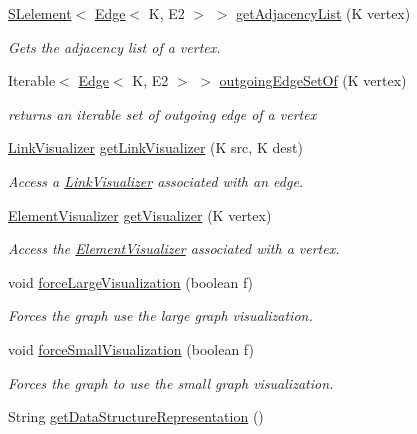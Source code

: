 \begin{DoxyCompactItemize}
\mbox{\hyperlink{classbridges_1_1base_1_1_s_lelement}{S\+Lelement}}$<$ \mbox{\hyperlink{classbridges_1_1base_1_1_edge}{Edge}}$<$ K, E2 $>$ $>$ \mbox{\hyperlink{classbridges_1_1base_1_1_graph_adj_list_aa8d25bc56b9a172999f0c62ee7e04b6f}{get\+Adjacency\+List}} (K vertex)
\begin{DoxyCompactList}\small\item\em Gets the adjacency list of a vertex. \end{DoxyCompactList}\item 
Iterable$<$ \mbox{\hyperlink{classbridges_1_1base_1_1_edge}{Edge}}$<$ K, E2 $>$ $>$ \mbox{\hyperlink{classbridges_1_1base_1_1_graph_adj_list_a084693f2f464b8f1d21d5ed2a864bf46}{outgoing\+Edge\+Set\+Of}} (K vertex)
\begin{DoxyCompactList}\small\item\em returns an iterable set of outgoing edge of a vertex \end{DoxyCompactList}\item 
\mbox{\hyperlink{classbridges_1_1base_1_1_link_visualizer}{Link\+Visualizer}} \mbox{\hyperlink{classbridges_1_1base_1_1_graph_adj_list_af93888dbd2a768a2401619ad5dc95560}{get\+Link\+Visualizer}} (K src, K dest)
\begin{DoxyCompactList}\small\item\em Access a \mbox{\hyperlink{classbridges_1_1base_1_1_link_visualizer}{Link\+Visualizer}} associated with an edge. \end{DoxyCompactList}\item 
\mbox{\hyperlink{classbridges_1_1base_1_1_element_visualizer}{Element\+Visualizer}} \mbox{\hyperlink{classbridges_1_1base_1_1_graph_adj_list_aafb45833cd5c13b6ce9bdece3fefde6a}{get\+Visualizer}} (K vertex)
\begin{DoxyCompactList}\small\item\em Access the \mbox{\hyperlink{classbridges_1_1base_1_1_element_visualizer}{Element\+Visualizer}} associated with a vertex. \end{DoxyCompactList}\item 
void \mbox{\hyperlink{classbridges_1_1base_1_1_graph_adj_list_a0e2dff032458bb03cb778b571ddcc9b6}{force\+Large\+Visualization}} (boolean f)
\begin{DoxyCompactList}\small\item\em Forces the graph use the large graph visualization. \end{DoxyCompactList}\item 
void \mbox{\hyperlink{classbridges_1_1base_1_1_graph_adj_list_ae14e51214742db0c4dab26c1d409f4ed}{force\+Small\+Visualization}} (boolean f)
\begin{DoxyCompactList}\small\item\em Forces the graph to use the small graph visualization. \end{DoxyCompactList}\item 
String \mbox{\hyperlink{classbridges_1_1base_1_1_graph_adj_list_a9bba66056cdf24197c41fff455e19a6c}{get\+Data\+Structure\+Representation}} ()
\end{DoxyCompactItemize}
